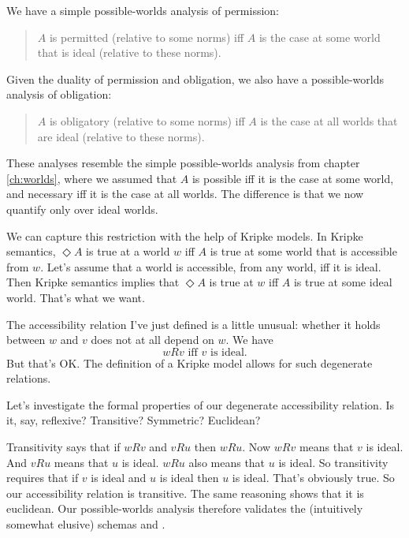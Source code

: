 We have a simple possible-worlds analysis of permission:
\begin{quote}
  $A$ is permitted (relative to some norms) iff $A$ is the case at some
  world that is ideal (relative to these norms).
\end{quote}
%
Given the duality of permission and obligation, we also have a possible-worlds
analysis of obligation:
%
\begin{quote}
  $A$ is obligatory (relative to some norms) iff $A$ is the case at
  all worlds that are ideal (relative to these norms).
\end{quote}

These analyses resemble the simple possible-worlds analysis from chapter
\ref{ch:worlds}, where we assumed that $A$ is possible iff it is the case at
some world, and necessary iff it is the case at all worlds. The difference is
that we now quantify only over ideal worlds.

We can capture this restriction with the help of Kripke models. In Kripke
semantics, $\Diamond A$ is true at a world $w$ iff $A$ is true at some world
that is accessible from $w$. Let's assume that a world is accessible, from any
world, iff it is ideal. Then Kripke semantics implies that $\Diamond A$ is true
at $w$ iff $A$ is true at some ideal world. That's what we want.

The accessibility relation I've just defined is a little unusual: whether it
holds between $w$ and $v$ does not at all depend on $w$. We have
\[
  wRv \text{ iff  $v$ is ideal.}
\]
But that's OK. The definition of a Kripke model allows for such
degenerate relations.

Let's investigate the formal properties of our degenerate accessibility
relation. Is it, say, reflexive? Transitive? Symmetric? Euclidean?

Transitivity says that if $wRv$ and $vRu$ then $wRu$. Now $wRv$ means that $v$
is ideal. And $vRu$ means that $u$ is ideal. $wRu$ also means that $u$ is ideal.
So transitivity requires that if $v$ is ideal and $u$ is ideal then $u$ is
ideal. That's obviously true. So our accessibility relation is transitive. The
same reasoning shows that it is euclidean. Our possible-worlds analysis
therefore validates the (intuitively somewhat elusive) schemas  and
.
%
\begin{principles}
\\
\end{principles}

